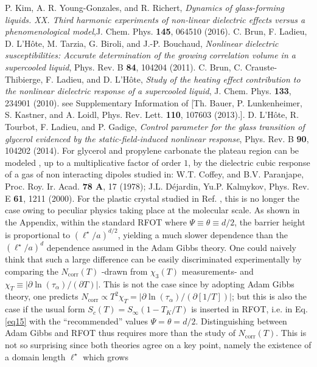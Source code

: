 \documentclass[single column,pre]{revtex4}
\begin{document}
\begin{thebibliography}{99}
 P. Kim, A. R. Young-Gonzales, and R. Richert, \textit{Dynamics of glass-forming liquids. XX. Third harmonic experiments of non-linear dielectric effects versus a phenomenological model},J. Chem. Phys. {\bf 145}, 064510 (2016).
 C. Brun, F. Ladieu, D. L'H\^ote, M. Tarzia, G. Biroli, and J.-P. Bouchaud, \textit{Nonlinear dielectric susceptibilities: Accurate determination of the growing correlation volume in a supercooled liquid}, Phys. Rev. B {\bf 84}, 104204 (2011).
 C. Brun, C. Crauste-Thibierge, F. Ladieu, and D. L'H\^ote, \textit{Study of the heating effect contribution to the nonlinear dielectric response of a supercooled liquid}, J. Chem. Phys. {\bf 133}, 234901 (2010). 
 see Supplementary Information of [Th. Bauer, P. Lunkenheimer, S. Kastner, and A. Loidl, Phys. Rev. Lett. {\bf 110}, 107603 (2013).].
 D. L'H\^ote, R. Tourbot, F. Ladieu, and P. Gadige, \textit{Control parameter for the glass transition of glycerol evidenced by the static-field-induced nonlinear response}, Phys. Rev. B {\bf 90}, 104202 (2014).
 For glycerol and propylene carbonate the plateau region can be modeled \cite{Bru11,Alb16}, up to a multiplicative factor of order $1$, by the dielectric cubic response of a gas of non interacting dipoles studied in: W.T. Coffey, and B.V. Paranjape, Proc. Roy. Ir. Acad. {\bf 78 A}, 17 (1978); J.L. D\'ejardin,  Yu.P. Kalmykov, Phys. Rev. E {\bf 61}, 1211 (2000). For the plastic crystal studied in Ref. \cite{Mic16}, this is no longer the case owing to peculiar physics taking place at the molecular scale. 
 As shown in the Appendix, within the standard RFOT where $\Psi \equiv \theta \equiv d/2$, the barrier height is proportional to $(\ell^\star / a)^{d/2}$, yielding 
a much slower dependence than the $(\ell^\star/a)^d$ dependence assumed in the Adam Gibbs theory. One could naively think that such a large difference can be easily 
discriminated experimentally by comparing the $N_{\text{corr}}(T)$ -drawn from $\chi_3(T)$ measurements- and $\chi_T \equiv \vert \partial \ln (\tau_{\alpha}) / (\partial T) \vert$. 
This is not the case since by adopting Adam Gibbs theory, one predicts $N_{\text{corr}} \propto T^2 \chi_T = \vert \partial \ln (\tau_{\alpha}) / (\partial [1/T]) \vert$; 
but this is also the case if the usual form $S_c(T) = S_{\infty} (1-T_K/T)$ is inserted in RFOT, i.e. in Eq. \ref{eq15} with the ``recommended'' values $\Psi = \theta = d/2$. Distinguishing between Adam Gibbs and RFOT thus requires 
more than the study of $N_{\text{corr}}(T)$. This is not so surprising since both theories agree on a key point, namely the existence of a domain length $\ell^\star$ which grows

\end{thebibliography}
\end{document}
